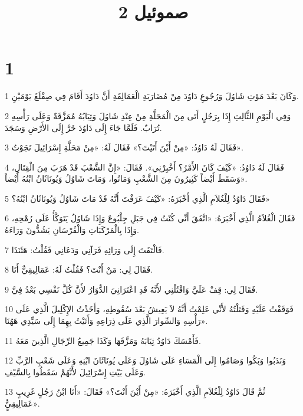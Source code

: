 

\title{2 صموئيل}


\chapter{1}

\par 1 وَكَانَ بَعْدَ مَوْتِ شَاوُلَ وَرُجُوعِ دَاوُدَ مِنْ مُضَارَبَةِ الْعَمَالِقَةِ أَنَّ دَاوُدَ أَقَامَ فِي صِقْلَغَ يَوْمَيْنِ.
\par 2 وَفِي الْيَوْمِ الثَّالِثِ إِذَا بِرَجُلٍ أَتَى مِنَ الْمَحَلَّةِ مِنْ عِنْدِ شَاوُلَ وَثِيَابُهُ مُمَزَّقَةٌ وَعَلَى رَأْسِهِ تُرَابٌ. فَلَمَّا جَاءَ إِلَى دَاوُدَ خَرَّ إِلَى الأَرْضِ وَسَجَدَ.
\par 3 فَقَالَ لَهُ دَاوُدُ: «مِنْ أَيْنَ أَتَيْتَ؟» فَقَالَ لَهُ: «مِنْ مَحَلَّةِ إِسْرَائِيلَ نَجَوْتُ».
\par 4 فَقَالَ لَهُ دَاوُدُ: «كَيْفَ كَانَ الأَمْرُ؟ أَخْبِرْنِي». فَقَالَ: «إِنَّ الشَّعْبَ قَدْ هَرَبَ مِنَ الْقِتَالِ، وَسَقَطَ أَيْضاً كَثِيرُونَ مِنَ الشَّعْبِ وَمَاتُوا، وَمَاتَ شَاوُلُ وَيُونَاثَانُ ابْنُهُ أَيْضاً».
\par 5 فَقَالَ دَاوُدُ لِلْغُلاَمِ الَّذِي أَخْبَرَهُ: «كَيْفَ عَرَفْتَ أَنَّهُ قَدْ مَاتَ شَاوُلُ وَيُونَاثَانُ ابْنُهُ؟»
\par 6 فَقَالَ الْغُلاَمُ الَّذِي أَخْبَرَهُ: «اتَّفَقَ أَنِّي كُنْتُ فِي جَبَلِ جِلْبُوعَ وَإِذَا شَاوُلُ يَتَوَكَّأُ عَلَى رُمْحِهِ، وَإِذَا بِالْمَرْكَبَاتِ وَالْفُرْسَانِ يَشُدُّونَ وَرَاءَهُ.
\par 7 فَالْتَفَتَ إِلَى وَرَائِهِ فَرَآنِي وَدَعَانِي فَقُلْتُ: هَئَنَذَا.
\par 8 فَقَالَ لِي: مَنْ أَنْتَ؟ فَقُلْتُ لَهُ: عَمَالِيقِيٌّ أَنَا.
\par 9 فَقَالَ لِي: قِفْ عَلَيَّ وَاقْتُلْنِي لأَنَّهُ قَدِ اعْتَرَانِيَ الدُّوَارُ لأَنَّ كُلَّ نَفْسِي بَعْدُ فِيَّ.
\par 10 فَوَقَفْتُ عَلَيْهِ وَقَتَلْتُهُ لأَنِّي عَلِمْتُ أَنَّهُ لاَ يَعِيشُ بَعْدَ سُقُوطِهِ، وَأَخَذْتُ الإِكْلِيلَ الَّذِي عَلَى رَأْسِهِ وَالسِّوارَ الَّذِي عَلَى ذِرَاعِهِ وَأَتَيْتُ بِهِمَا إِلَى سَيِّدِي هَهُنَا».
\par 11 فَأَمْسَكَ دَاوُدُ ثِيَابَهُ وَمَزَّقَهَا وَكَذَا جَمِيعُ الرِّجَالِ الَّذِينَ مَعَهُ.
\par 12 وَنَدَبُوا وَبَكُوا وَصَامُوا إِلَى الْمَسَاءِ عَلَى شَاوُلَ وَعَلَى يُونَاثَانَ ابْنِهِ وَعَلَى شَعْبِ الرَّبِّ وَعَلَى بَيْتِ إِسْرَائِيلَ لأَنَّهُمْ سَقَطُوا بِالسَّيْفِ.
\par 13 ثُمَّ قَالَ دَاوُدُ لِلْغُلاَمِ الَّذِي أَخْبَرَهُ: «مِنْ أَيْنَ أَنْتَ؟» فَقَالَ: «أَنَا ابْنُ رَجُلٍ غَرِيبٍ عَمَالِيقِيٌٍّ».
